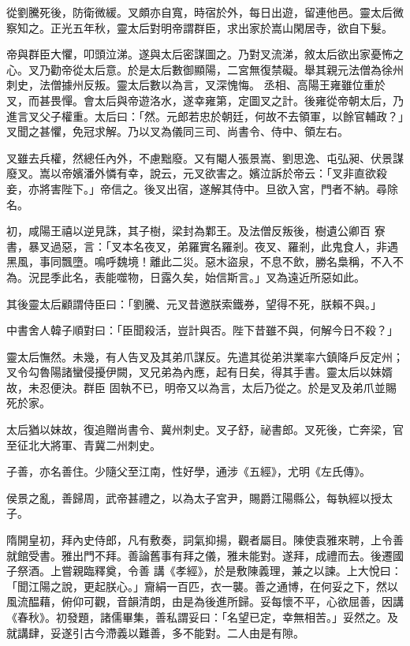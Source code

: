 \begin{pinyinscope}
 從劉騰死後，防衛微緩。叉頗亦自寬，時宿於外，每日出遊，留連他邑。靈太后微察知之。正光五年秋，靈太后對明帝謂群臣，求出家於嵩山閑居寺，欲自下髮。



 帝與群臣大懼，叩頭泣涕。遂與太后密謀圖之。乃對叉流涕，敘太后欲出家憂怖之心。叉乃勸帝從太后意。於是太后數御顯陽，二宮無復禁礙。舉其親元法僧為徐州刺史，法僧據州反叛。靈太后數以為言，叉深愧悔。
 丞相、高陽王雍雖位重於叉，而甚畏憚。會太后與帝遊洛水，遂幸雍第，定圖叉之計。後雍從帝朝太后，乃進言叉父子權重。太后曰：「然。元郎若忠於朝廷，何故不去領軍，以餘官輔政？」叉聞之甚懼，免冠求解。乃以叉為儀同三司、尚書令、侍中、領左右。



 叉雖去兵權，然總任內外，不慮黜廢。又有閹人張景嵩、劉思逸、屯弘昶、伏景謀廢叉。嵩以帝嬪潘外憐有幸，說云，元叉欲害之。嬪泣訴於帝云：「叉非直欲殺妾，亦將害陛下。」帝信之。後叉出宿，遂解其侍中。旦欲入宮，門者不納。尋除名。



 初，咸陽王禧以逆見誅，其子樹，梁封為鄴王。及法僧反叛後，樹遺公卿百
 寮書，暴叉過惡，言：「叉本名夜叉，弟羅實名羅剎。夜叉、羅剎，此鬼食人，非遇黑風，事同飄墮。鳴呼魏境！離此二災。惡木盜泉，不息不飲，勝名梟稱，不入不為。況昆季此名，表能噬物，日露久矣，始信斯言。」叉為遠近所惡如此。



 其後靈太后顧謂侍臣曰：「劉騰、元叉昔邀朕索鐵券，望得不死，朕賴不與。」



 中書舍人韓子順對曰：「臣聞殺活，豈計與否。陛下昔雖不與，何解今日不殺？」



 靈太后憮然。未幾，有人告叉及其弟爪謀反。先遣其從弟洪業率六鎮降戶反定州；叉令勾魯陽諸蠻侵擾伊闕，叉兄弟為內應，起有日矣，得其手書。靈太后以妹婿故，未忍便決。群臣
 固執不已，明帝又以為言，太后乃從之。於是叉及弟爪並賜死於家。



 太后猶以妹故，復追贈尚書令、冀州刺史。叉子舒，祕書郎。叉死後，亡奔梁，官至征北大將軍、青冀二州刺史。



 子善，亦名善住。少隨父至江南，性好學，通涉《五經》，尤明《左氏傳》。



 侯景之亂，善歸周，武帝甚禮之，以為太子宮尹，賜爵江陽縣公，每執經以授太子。



 隋開皇初，拜內史侍郎，凡有敷奏，詞氣抑揚，觀者屬目。陳使袁雅來聘，上令善就館受書。雅出門不拜。善論舊事有拜之儀，雅未能對。遂拜，成禮而去。後遷國子祭酒。上嘗親臨釋奠，令善
 講《孝經》，於是敷陳義理，兼之以諫。上大悅曰：「聞江陽之說，更起朕心。」齎絹一百匹，衣一襲。善之通博，在何妥之下，然以風流醖藉，俯仰可觀，音韻清朗，由是為後進所歸。妥每懷不平，心欲屈善，因講《春秋》。初發題，諸儒畢集，善私謂妥曰：「名望已定，幸無相苦。」妥然之。及就講肆，妥遂引古今滯義以難善，多不能對。二人由是有隙。




\end{pinyinscope}
